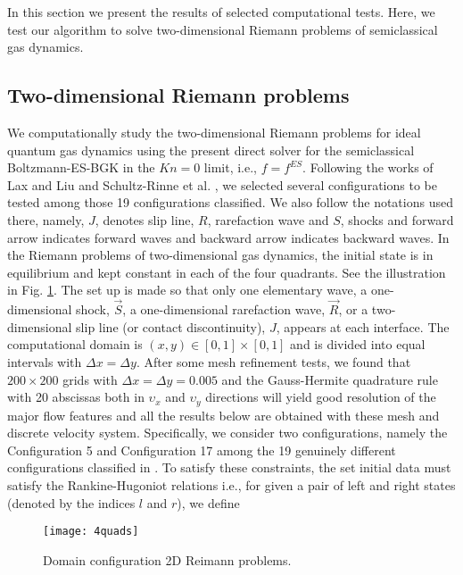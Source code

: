 \documentclass{rsproca}%
\begin{document}
In this section we present the results of selected computational tests.  Here, we test our algorithm to solve two-dimensional Riemann problems of semiclassical gas dynamics.

\subsection{Two-dimensional Riemann problems}
\label{Riemannp}
We computationally study the two-dimensional Riemann problems for ideal quantum gas dynamics using the present direct solver for the semiclassical Boltzmann-ES-BGK in the $Kn =0$ limit, i.e., $f=f^{ES}$.  Following the works of Lax and Liu \cite{Laxliu95} and Schultz-Rinne et al. \cite{schultzrinne}, we selected several configurations to be tested among those 19 configurations classified.  We also follow the notations used there, namely, $J$, denotes slip line, $R$, rarefaction wave and $S$, shocks and forward arrow indicates forward waves and backward arrow indicates backward waves. In the Riemann problems of two-dimensional gas dynamics, the initial state is in equilibrium and kept constant in each of the four quadrants. See the illustration in Fig. \ref{fig:quadrants}. The set up is made so that only one elementary wave, a one-dimensional shock, $\vec{S}$, a one-dimensional rarefaction wave, $\vec{R}$, or a two-dimensional slip line (or contact discontinuity), $J$, appears at each interface.  The computational domain is $(x,y) \in [0,1]\times [0,1]$ and is divided into equal intervals with $\Delta x= \Delta y$.  After some mesh refinement tests, we found that $200\times 200$ grids with $\Delta x=\Delta y=0.005$ and the Gauss-Hermite quadrature rule with 20 abscissas both in $\upsilon_x$ and $\upsilon_y$ directions will yield good resolution of the major flow features and all the results below are obtained with these mesh and discrete velocity system.
Specifically, we consider two configurations, namely the Configuration 5 and Configuration 17 among the 19 genuinely different configurations classified in \cite{Laxliu95}\cite{schultzrinne}.    To satisfy these constraints, the set initial data must satisfy the Rankine-Hugoniot relations i.e., for given a pair of left and right states (denoted by the indices $l$ and $r$), we define \\

\begin{figure}
	\centering
	\texttt{[image: 4quads]}
  \caption{Domain configuration 2D Reimann problems.}
  \label{fig:quadrants}
\end{figure}
\end{document}
